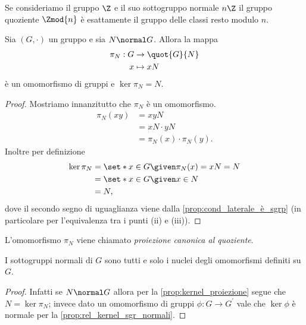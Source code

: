 \begin{example}
    Se consideriamo il gruppo $\Z$ e il suo sottogruppo normale $n\Z$ il gruppo quoziente $\Zmod{n}$ è esattamente il gruppo delle classi resto modulo $n$.
\end{example}

\begin{proposition}\label{prop:kernel_proiezione}
    Sia $(G, \cdot)$ un gruppo e sia $N \normal G$. Allora la mappa 
    \begin{align} \label{eq:proiezione_gruppi}
        \begin{split}
            \pi_N : G &\to \quot{G}{N}\\
            x &\mapsto xN
        \end{split}
    \end{align}
    è un omomorfismo di gruppi e $\ker \pi_N = N$.
\end{proposition}
\begin{proof}
    Mostriamo innanzitutto che $\pi_N$ è un omomorfismo. \begin{align*}
        \pi_N(xy) &= xyN \\
        &= xN \cdot yN\\
        &= \pi_N(x) \cdot \pi_N(y).
    \end{align*}
    Inoltre per definizione \begin{align*}
        \ker \pi_N &= \set*{x \in G \given \pi_N(x) = xN = N} \\
        &= \set*{x \in G \given x \in N}\\
        &= N,  
    \end{align*} dove il secondo segno di uguaglianza viene dalla \autoref{prop:cond_laterale_è_sgrp} (in particolare per l'equivalenza tra i punti (ii) e (iii)).
\end{proof}

L'omomorfismo $\pi_N$ viene chiamato \emph{proiezione canonica al quoziente}.

\begin{corollary}
    I sottogruppi normali di $G$ sono tutti e solo i nuclei degli omomorfismi definiti su $G$.
\end{corollary}
\begin{proof}
    Infatti se $N \normal G$ allora per la \autoref{prop:kernel_proiezione} segue che $N = \ker \pi_N$; invece dato un omomorfismo di gruppi $\phi : G \to G^\prime$ vale che $\ker \phi$ è normale per la \autoref{prop:rel_kernel_sgr_normali}.
\end{proof}

